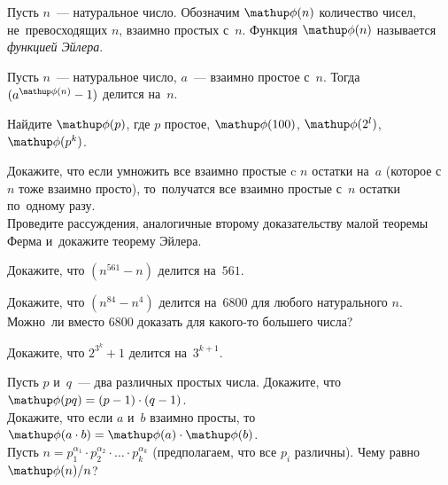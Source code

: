 Пусть $n$~--- натуральное число.
Обозначим $\eulerphi(n)$ количество чисел, не~превосходящих $n$, взаимно
простых с~$n$.
Функция $\eulerphi(n)$ называется \emph{функцией Эйлера}.

Пусть $n$~--- натуральное число, $a$~--- взаимно простое с~$n$.
Тогда $(a^{\eulerphi(n)} - 1)$ делится на~$n$.

\begin{problems}

\item
Найдите $\eulerphi(p)$, где $p$ простое, $\eulerphi(100)$, $\eulerphi(2^l)$,
$\eulerphi(p^k)$.

\item
\subproblem
Докажите, что если умножить все взаимно простые c $n$ остатки на~$a$
(которое с~$n$ тоже взаимно просто), то~получатся все взаимно простые с~$n$
остатки по~одному разу.
\\
\subproblem
Проведите рассуждения, аналогичные второму доказательству малой теоремы Ферма
и~докажите теорему Эйлера.

\item
Докажите, что $(n^{561} - n)$ делится на~$561$.

\item
\subproblem
Докажите, что $(n^{84} - n^4)$ делится на~6800 для любого натурального $n$.
\\
\subproblem
Можно~ли вместо 6800 доказать для какого-то большего числа?

\item
Докажите, что $2^{3^k} + 1$ делится на~$3^{k+1}$.

\item
\subproblem
Пусть $p$ и~$q$~--- два различных простых числа.
Докажите, что $\eulerphi(p q) = (p - 1) \cdot (q - 1)$.
\\
\subproblem
Докажите, что если $a$ и~$b$ взаимно просты,
то~$\eulerphi(a \cdot b) = \eulerphi(a) \cdot \eulerphi(b)$.
\\
\subproblem
Пусть
\(
    n
=
    p_1^{\alpha_1} \cdot p_2^{\alpha_2} \cdot \ldots \cdot p_k^{\alpha_k}
\)
(предполагаем, что все $p_i$ различны).
Чему равно $\eulerphi(n) / n$?

\end{problems}

\endgroup %

